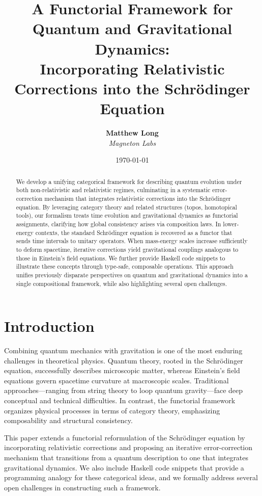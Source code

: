 \documentclass[12pt]{article}
\title{\textbf{A Functorial Framework for Quantum and Gravitational Dynamics: \\ 
Incorporating Relativistic Corrections into the Schrödinger Equation}}
\author{
  \textbf{Matthew Long} \\
  \emph{Magneton Labs}
}
\date{\today}
\begin{document}
\maketitle

\begin{abstract}
We develop a unifying categorical framework for describing quantum evolution under both non-relativistic and relativistic regimes, culminating in a systematic error-correction mechanism that integrates relativistic corrections into the Schrödinger equation. By leveraging category theory and related structures (topos, homotopical tools), our formalism treats time evolution and gravitational dynamics as functorial assignments, clarifying how global consistency arises via composition laws. In lower-energy contexts, the standard Schrödinger equation is recovered as a functor that sends time intervals to unitary operators. When mass-energy scales increase sufficiently to deform spacetime, iterative corrections yield gravitational couplings analogous to those in Einstein's field equations. We further provide Haskell code snippets to illustrate these concepts through type-safe, composable operations. This approach unifies previously disparate perspectives on quantum and gravitational dynamics into a single compositional framework, while also highlighting several open challenges.
\end{abstract}

\tableofcontents

\section{Introduction}
Combining quantum mechanics with gravitation is one of the most enduring challenges in theoretical physics. Quantum theory, rooted in the Schrödinger equation, successfully describes microscopic matter, whereas Einstein's field equations govern spacetime curvature at macroscopic scales. Traditional approaches---ranging from string theory to loop quantum gravity---face deep conceptual and technical difficulties. In contrast, the functorial framework organizes physical processes in terms of category theory, emphasizing composability and structural consistency.

This paper extends a functorial reformulation of the Schrödinger equation by incorporating relativistic corrections and proposing an iterative error-correction mechanism that transitions from a quantum description to one that integrates gravitational dynamics. We also include Haskell code snippets that provide a programming analogy for these categorical ideas, and we formally address several open challenges in constructing such a framework.
\end{document}
